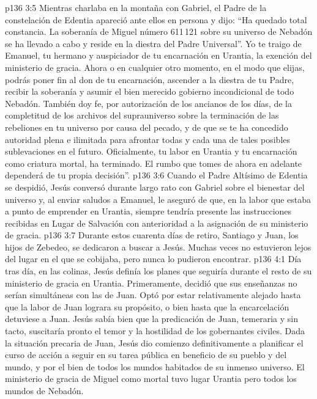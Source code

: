 \vs p136 3:5 Mientras charlaba en la montaña con Gabriel, el Padre de la constelación de Edentia apareció ante ellos en persona y dijo: “Ha quedado total constancia. La soberanía de Miguel número 611\,121 sobre su universo de Nebadón se ha llevado a cabo y reside en la diestra del Padre Universal”. Yo te traigo de Emanuel, tu hermano y auspiciador de tu encarnación en Urantia, la exención del ministerio de gracia. Ahora o en cualquier otro momento, en el modo que elijas, podrás poner fin al don de tu encarnación, ascender a la diestra de tu Padre, recibir la soberanía y asumir el bien merecido gobierno incondicional de todo Nebadón. También doy fe, por autorización de los ancianos de los días, de la completitud de los archivos del suprauniverso sobre la terminación de las rebeliones en tu universo por causa del pecado, y de que se te ha concedido autoridad plena e ilimitada para afrontar todas y cada una de tales posibles sublevaciones en el futuro. Oficialmente, tu labor en Urantia y tu encarnación como criatura mortal, ha terminado. El rumbo que tomes de ahora en adelante dependerá de tu propia decisión”.
\vs p136 3:6 Cuando el Padre Altísimo de Edentia se despidió, Jesús conversó durante largo rato con Gabriel sobre el bienestar del universo y, al enviar saludos a Emanuel, le aseguró de que, en la labor que estaba a punto de emprender en Urantia, siempre tendría presente las instrucciones recibidas en Lugar de Salvación con anterioridad a la asignación de su ministerio de gracia.
\vs p136 3:7 \pc Durante estos cuarenta días de retiro, Santiago y Juan, los hijos de Zebedeo, se dedicaron a buscar a Jesús. Muchas veces no estuvieron lejos del lugar en el que se cobijaba, pero nunca lo pudieron encontrar.
\vs p136 4:1 Día tras día, en las colinas, Jesús definía los planes que seguiría durante el resto de su ministerio de gracia en Urantia. Primeramente, decidió que sus enseñanzas no serían simultáneas con las de Juan. Optó por estar relativamente alejado hasta que la labor de Juan lograra su propósito, o bien hasta que la encarcelación detuviese a Juan. Jesús sabía bien que la predicación de Juan, temeraria y sin tacto, suscitaría pronto el temor y la hostilidad de los gobernantes civiles. Dada la situación precaria de Juan, Jesús dio comienzo definitivamente a planificar el curso de acción a seguir en su tarea pública en beneficio de su pueblo y del mundo, y por el bien de todos los mundos habitados de su inmenso universo. El ministerio de gracia de Miguel como mortal tuvo lugar  Urantia pero  todos los mundos de Nebadón.
